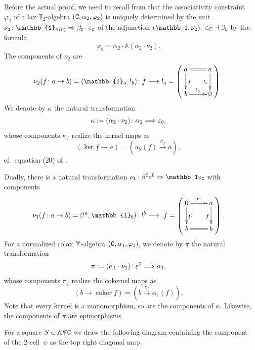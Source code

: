 \documentclass[12pt,leqno]{amsart}
\theoremstyle{definition}
\def\T{\mathbb{T}}
\def\Ar{\mathbb{A}}
\def\ee{\varepsilon}
\def\id{{\mathbb 1}}
\newcommand{\C}{{\tt C}}
\newcommand{\uu}{\mathbb{1}}
\newcommand{\eK}{\alpha_2}%
\newcommand{\eC}{\alpha_1}%
\newcommand{\4}{\texttt{4}}
\newcommand{\Vr}{\text{\raisebox{\depth}{\scalebox{1}[-1]{$\Ar$}}}}
\DeclareMathOperator{\coker}{coker}
\renewcommand{\epsilon}{\varepsilon}
\renewcommand{\phi}{\varphi}
\begin{document}
Before the actual proof, we need to recall from \cite[Proposition~6]{pasticio}
that the associativity constraint 
$\phi_2$ of a lax $\T_2$-algebra $(\C,\eK,\phi_2)$ is
uni\-quely determined by the unit
$\nu_2\colon \uu_{\Ar (\C)}\Rightarrow \beta_\C \cdot \ee_\C$ of the
adjunction $(\id,\nu_2)\colon \epsilon_C \dashv
\beta_\C$ by the formula
\begin{equation}\label{equation:phi_via_nu}
\phi_2=\alpha_2\cdot \Ar(\alpha_2\cdot\nu_2).
\end{equation}
The components of $\nu_2$ are
\begin{equation}
\label{Pul pate a uz je tma.}
\nu_2{(f\colon a\to b)}=(\uu_a,!_b)\colon f\longrightarrow \ !_a =\left(
\raisebox{2em}{\xymatrix{
	a \ar[d]^{f}\ar@{=}[r]& a \ar[d]_{!_a}
\\
	b \ar[r]^{!_b}& 0
}}
\right).
\end{equation}
We denote by $\kappa$ the natural transformation 
\begin{equation}\label{equation:iota}
\kappa:=(\alpha_2\cdot\nu_2)\colon
  \alpha_2\Longrightarrow \ee_\C,
  \end{equation}
  whose components $\kappa_f$ realize the kernel maps as
\[
\left(\ker f \to a \right) = \left(\alpha_2(f)\xrightarrow{\kappa_f}
  a\right),
\] 
cf.~equation (20) of \cite{pasticio}.
  
Dually, there is a natural transformation $\nu_1\colon \beta^\C\epsilon^\C \Rightarrow \id_{\Vr\C}$ with components
  \begin{equation}
\label{Pul pate ... dual}
\nu_1{(f\colon a\to b)}=(!^a,\uu_b)\colon !^b\longrightarrow \ f=\left(
\raisebox{2em}{\xymatrix{
	0 \ar[d]^{!^b}\ar[r]^{!^a}& a \ar[d]_{f}
\\
	b \ar@{=}[r]& b
}}
\right).
\end{equation}
For a normalized colax $\Vr$-algebra $(\C,\eC,\phi_1)$, we denote by
$\pi$ the natural transformation
  $$\pi:=(\eC\cdot\nu_1)\colon
  \ee^\C\Longrightarrow \eC,$$
whose components $\pi_f$ realize the cokernel maps as
\[ \left(b\to \coker f \right) = \left(b\xrightarrow{\pi_f} \alpha_1(f)\right).\]
Note that every kernel is a monomorphism, so are the components of
$\kappa$. Likewise, the components of $\pi$ are epimorphisms.

For a square $S\in \Ar\Vr\C$ we draw the following diagram containing the component of the 2-cell~$\psi$ as the top right diagonal map.
\end{document}
